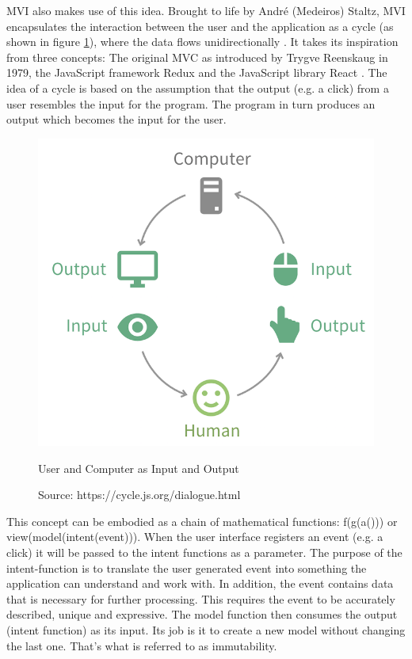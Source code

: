 MVI also makes use of this idea. Brought to life by André (Medeiros) Staltz, MVI encapsulates the interaction between the user and the application as a cycle 
(as shown in figure 
\ref{fig:userComputerInputOutput}), 
where the data flows unidirectionally 
\cite{unidirectionalDataFlowFluxArchitectureIlyGelman2017,unidirectionalDataFlowTamingTheStateinReactRobinWieruch2018,unidirectionalDataFlowTheCompleteReduxBookIlyGelman2017}.
It takes its inspiration from three concepts: The original MVC as introduced by Trygve Reenskaug in 1979, the JavaScript framework Redux 
\cite{reduxReduxQuickStartGuidJamesLee2019} 
and the JavaScript library React 
\cite{reactJSReactJsAnOpenSourceNaimulIslamNaim2017}. 
The idea of a cycle is based on the assumption that the output (e.g. a click) from a user resembles the input for the program. The program in turn produces an output 
which becomes the input for the user.
\begin{figure}[ht]
    \centering
    \includegraphics[height=0.5\textwidth]{./images/mvi-cycle}
    \caption{User and Computer as Input and Output}
    \caption*{Source: https://cycle.js.org/dialogue.html}
    \label{fig:userComputerInputOutput}
\end{figure}
This concept can be embodied as a chain of mathematical functions: f(g(a())) or view(model(intent(event))).
When the user interface registers an event (e.g. a click) it will be passed to the intent functions as a parameter. 
The purpose of the intent-function is to translate the user generated event into something the application can understand and work with.
In addition, the event contains data that is necessary for further processing. This requires the event to be accurately described, unique and expressive.
The model function then consumes the output (intent function) as its input. Its job is it to create a new model without changing the last one. 
That's what is referred to as immutability. 
